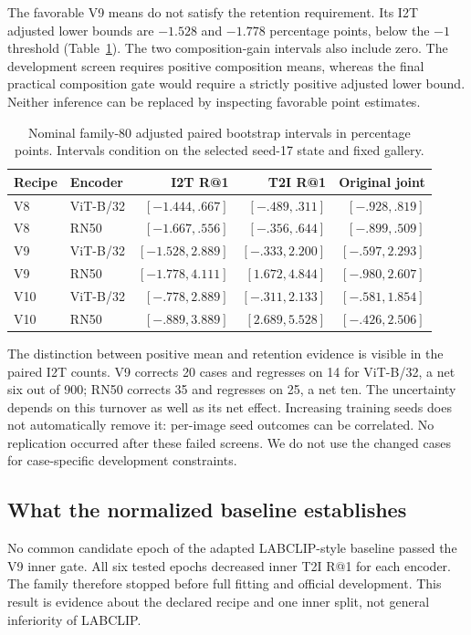 \documentclass[11pt]{article}
\begin{document}
The favorable V9 means do not satisfy the retention requirement. Its I2T
adjusted lower bounds are $-1.528$ and $-1.778$ percentage points,
below the $-1$ threshold (Table~\ref{tab:ci}). The two composition-gain
intervals also include zero. The development screen requires positive
composition means, whereas the final practical composition gate would
require a strictly positive adjusted lower bound. Neither inference can
be replaced by inspecting favorable point estimates.

\begin{table}[t]
\centering\small
\caption{Nominal family-80 adjusted paired bootstrap intervals in
percentage points. Intervals condition on the selected seed-17 state and
fixed gallery.}\label{tab:ci}
\begin{tabular}{llrrr}
\toprule
Recipe & Encoder & I2T R@1 & T2I R@1 & Original joint\\
\midrule
V8 & ViT-B/32 & $[-1.444,.667]$ & $[-.489,.311]$ & $[-.928,.819]$\\
V8 & RN50 & $[-1.667,.556]$ & $[-.356,.644]$ & $[-.899,.509]$\\
V9 & ViT-B/32 & $[-1.528,2.889]$ & $[-.333,2.200]$ & $[-.597,2.293]$\\
V9 & RN50 & $[-1.778,4.111]$ & $[1.672,4.844]$ & $[-.980,2.607]$\\
V10 & ViT-B/32 & $[-.778,2.889]$ & $[-.311,2.133]$ & $[-.581,1.854]$\\
V10 & RN50 & $[-.889,3.889]$ & $[2.689,5.528]$ & $[-.426,2.506]$\\
\bottomrule
\end{tabular}
\end{table}

The distinction between positive mean and retention evidence is visible
in the paired I2T counts. V9 corrects 20 cases and regresses on 14 for
ViT-B/32, a net six out of 900; RN50 corrects 35 and regresses on 25, a
net ten. The uncertainty depends on this turnover as well as its net
effect. Increasing training seeds does not automatically remove it:
per-image seed outcomes can be correlated. No replication occurred after
these failed screens. We do not use the changed cases for case-specific
development constraints.

\subsection{What the normalized baseline establishes}
No common candidate epoch of the adapted LABCLIP-style baseline passed the
V9 inner gate. All six tested epochs decreased inner T2I R@1 for each
encoder. The family therefore stopped before full fitting and official
development. This result is evidence about the declared recipe and one
inner split, not general inferiority of LABCLIP.
\end{document}
